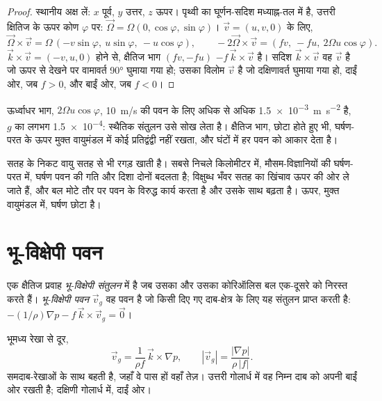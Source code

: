 \begin{proof}
स्थानीय अक्ष लें: $x$ पूर्व, $y$ उत्तर, $z$ ऊपर। पृथ्वी का घूर्णन-सदिश मध्याह्न-तल में है, उत्तरी क्षितिज के ऊपर कोण $\varphi$ पर: $\vec\Omega =
\Omega(0, \cos\varphi, \sin\varphi)$। $\vec v = (u, v, 0)$ के लिए,
\[
  \vec\Omega\times\vec v = \Omega\,(-v\sin\varphi,\ u\sin\varphi,\ -u\cos\varphi),
  \qquad -2\vec\Omega\times\vec v = (f v,\ -f u,\ 2\Omega u\cos\varphi).
\]
$\vec k\times\vec v = (-v, u, 0)$ होने से, क्षैतिज भाग $(fv, -fu)$
$-f\,\vec k\times\vec v$ है। सदिश $\vec k\times\vec v$ वह $\vec v$ है जो ऊपर से देखने पर वामावर्त \ang{90} घुमाया गया हो; उसका विलोम $\vec v$ है जो दक्षिणावर्त घुमाया गया हो,
दाईं ओर, जब $f > 0$, और बाईं ओर, जब $f < 0$।
\end{proof}

ऊर्ध्वाधर भाग, $2\Omega u\cos\varphi$, \qty{10}{m/s} की पवन के लिए अधिक से अधिक \qty{1.5e-3}{m.s^{-2}} है, $g$ का लगभग \num{1.5e-4}: स्थैतिक संतुलन उसे सोख लेता है। क्षैतिज भाग, छोटा होते हुए भी, घर्षण-परत के ऊपर मुक्त वायुमंडल में कोई प्रतिद्वंद्वी नहीं रखता, और घंटों में हर पवन को आकार देता है।

सतह के निकट वायु सतह से भी रगड़ खाती है। सबसे निचले किलोमीटर में, मौसम-विज्ञानियों की घर्षण-परत में, घर्षण पवन की गति और दिशा दोनों बदलता है; विक्षुब्ध भँवर सतह का खिंचाव ऊपर की ओर ले जाते हैं, और बल मोटे तौर पर पवन के विरुद्ध कार्य करता है और उसके साथ बढ़ता है। ऊपर, मुक्त वायुमंडल में, घर्षण छोटा है।

\section{भू-विक्षेपी पवन}\label{sec:b1:atmospheric-circulation:geostrophic}

\begin{definition}[भू-विक्षेपी संतुलन, भू-विक्षेपी पवन]\label{def:b1:atmospheric-circulation:geostrophic}
एक क्षैतिज प्रवाह \emph{भू-विक्षेपी संतुलन} में है जब उसका  और उसका कोरिऑलिस बल एक-दूसरे को निरस्त करते हैं। \emph{भू-विक्षेपी पवन} $\vec v_g$ वह पवन है जो किसी दिए गए दाब-क्षेत्र के लिए यह संतुलन प्राप्त करती है:
$-(1/\rho)\nabla p - f\,\vec k\times\vec v_g = \vec 0$।
\end{definition}

\begin{theorem}[भू-विक्षेपी पवन]\label{thm:b1:atmospheric-circulation:geostrophic}
भूमध्य रेखा से दूर,
\[
  \vec v_g = \frac{1}{\rho f}\,\vec k\times\nabla p, \qquad
  |\vec v_g| = \frac{|\nabla p|}{\rho\,|f|} .
\]
 समदाब-रेखाओं के साथ बहती है, जहाँ वे पास हों वहाँ तेज़। उत्तरी गोलार्ध में वह निम्न दाब को अपनी बाईं ओर रखती है; दक्षिणी गोलार्ध में, दाईं ओर।
\end{theorem}

